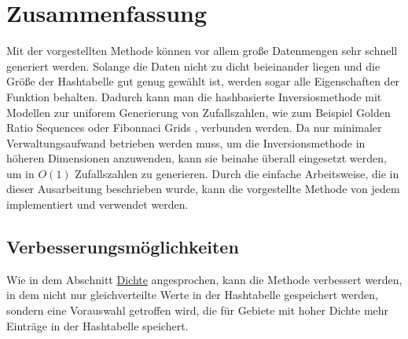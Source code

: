 \section{Zusammenfassung}
Mit der vorgestellten Methode können vor allem große Datenmengen sehr schnell generiert werden. 
Solange die Daten nicht zu dicht beieinander liegen und die Größe der Hashtabelle gut genug gewählt 
ist, werden sogar alle Eigenschaften der Funktion behalten. Dadurch kann man die hashbasierte 
Inversiosmethode mit Modellen zur uniforem Generierung von Zufallszahlen, wie zum Beispiel Golden 
Ratio Sequences \cite{schretter-golden_ratio_sequences-2012} oder Fibonnaci Grids 
\cite{frisch_hanebeck-deterministic_gaussian_sampling-2021}, verbunden werden. Da nur minimaler 
Verwaltungsaufwand betrieben werden muss, um die Inversionsmethode in höheren Dimensionen anzuwenden, 
kann sie beinahe überall eingesetzt werden, um in $O(1)$ Zufallszahlen zu generieren. Durch die 
einfache Arbeitsweise, die in dieser Ausarbeitung beschrieben wurde, kann die vorgestellte Methode 
von jedem implementiert und verwendet werden. 


\subsection{Verbesserungsmöglichkeiten}
Wie in dem Abschnitt \hyperref[Dichte]{Dichte} angesprochen, kann die Methode verbessert werden, 
in dem nicht nur gleichverteilte Werte in der Hashtabelle gespeichert werden, sondern eine 
Vorauswahl getroffen wird, die für Gebiete mit hoher Dichte mehr Einträge in der Hashtabelle speichert.
